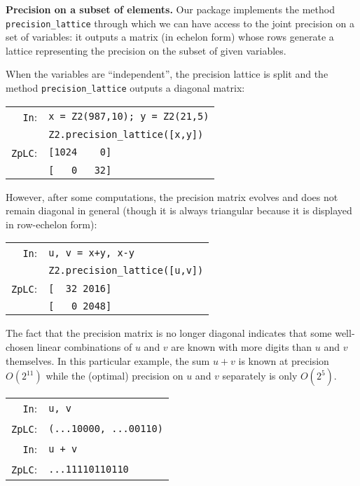 \documentclass[sigconf]{acmart}
\newcommand{\cIn}{{\color{input} \tt \phantom{Zp}In}:}
\newcommand{\cZpLC}{{\color{output} \tt ZpLC}:}
\theoremstyle{definition}
\begin{document}
\noindent \textbf{Precision on a subset of elements.}
%
Our package implements the method {\color{method}\verb?precision_lattice?} through which 
we can have access to the joint precision on a set of variables: it 
outputs a matrix (in echelon form) whose rows generate a lattice 
representing the precision on the subset of given variables.

When the variables are ``independent'', the precision lattice is
split and the method {\color{method}\verb?precision_lattice?} outputs a diagonal
matrix:

\smallskip

{\noindent \small
\begin{tabular}{rl}
\cIn   & \verb?x = ?{\color{ring}\verb?Z2?}\verb?(987,10); y = ?{\color{ring}\verb?Z2?}\verb?(21,5)? \\
       & {\color{ring}\verb?Z2?}\verb?.?{\color{method}\verb?precision_lattice?}\verb?([x,y])? \\
\cZpLC & \verb?[1024    0]? \\
       & \verb?[   0   32]?
\end{tabular}}

\smallskip

\noindent
However, after some computations, the precision matrix evolves and 
does not remain diagonal in general (though it is always triangular
because it is displayed in row-echelon form):

\smallskip

{\noindent \small
\begin{tabular}{rl}
\cIn   & \verb?u, v = x+y, x-y? \\
       & {\color{ring}\verb?Z2?}\verb?.?{\color{method}\verb?precision_lattice?}\verb?([u,v])? \\
\cZpLC & \verb?[  32 2016]? \\
       & \verb?[   0 2048]?
\end{tabular}}

\smallskip

\noindent
The fact that the precision matrix is no longer diagonal indicates
that some well-chosen linear combinations of $u$ and $v$ are known
with more digits than $u$ and $v$ themselves. In this particular
example, the sum $u+v$ is known at precision $O(2^{11})$ while the
(optimal) precision on $u$ and $v$ separately is only $O(2^5)$.

\smallskip

{\noindent \small
\begin{tabular}{rl}
\cIn   & \verb?u, v? \\
\cZpLC & \verb?(...10000, ...00110)? \\
\cIn   & \verb?u + v? \\
\cZpLC & \verb?...11110110110? \\
\end{tabular}}
\end{document}
